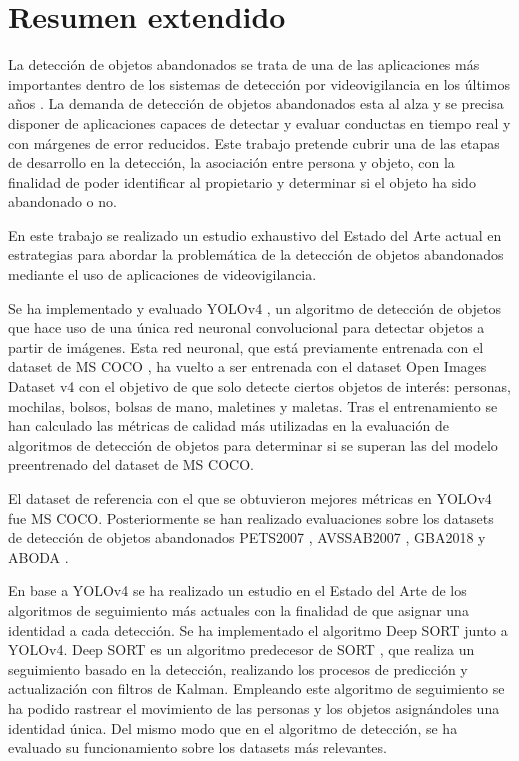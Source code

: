 
\chapter*{Resumen extendido}
\label{cha:resumen-extendido}


La detección de objetos abandonados se trata de una de las aplicaciones más importantes dentro de los sistemas de detección por videovigilancia en los últimos años \cite{DBLP:journals/spm/PlataniotisR05}. La demanda de detección de objetos abandonados esta al alza y se precisa disponer de aplicaciones capaces de detectar y evaluar conductas en tiempo real y con márgenes de error reducidos. Este trabajo pretende cubrir una de las etapas de desarrollo en la detección, la asociación entre persona y objeto, con la finalidad de poder identificar al propietario y determinar si el objeto ha sido abandonado o no.

En este trabajo se realizado un estudio exhaustivo del Estado del Arte actual en estrategias para abordar la problemática de la detección de objetos abandonados mediante el uso de aplicaciones de videovigilancia.

Se ha implementado y evaluado YOLOv4 \cite{bochkovskiy2020yolov4}, un algoritmo de detección de objetos que hace uso de una única red neuronal convolucional para detectar objetos a partir de imágenes. Esta red neuronal, que está previamente entrenada con el dataset de MS COCO \cite{lin2015microsoft}, ha vuelto a ser entrenada con el dataset Open Images Dataset v4 \cite{Kuznetsova_2020} con el objetivo de que solo detecte ciertos objetos de interés: personas, mochilas, bolsos, bolsas de mano, maletines y maletas. Tras el entrenamiento se han calculado las métricas de calidad más utilizadas en la evaluación de algoritmos de detección de objetos para determinar si se superan las del modelo preentrenado del dataset de MS COCO.

El dataset de referencia con el que se obtuvieron mejores métricas en YOLOv4 fue MS COCO. Posteriormente se han realizado evaluaciones sobre los datasets de detección de objetos abandonados PETS2007 \cite{pets2007-dataset}, AVSSAB2007 \cite{AVSSAB2007-dataset}, GBA2018 \cite{gba-dataset} y ABODA \cite{aboda-dataset}. 

En base a YOLOv4 se ha realizado un estudio en el Estado del Arte de los algoritmos de seguimiento más actuales con la finalidad de que asignar una identidad a cada detección. Se ha implementado el algoritmo Deep SORT \cite{Wojke2017simple} junto a YOLOv4. Deep SORT  es un algoritmo predecesor de SORT \cite{Bewley_2016}, que realiza un seguimiento basado en la detección, realizando los procesos de predicción y actualización con filtros de Kalman. Empleando este algoritmo de seguimiento se ha podido rastrear el movimiento de las personas y los objetos asignándoles una identidad única. Del mismo modo que en el algoritmo de detección, se ha evaluado su funcionamiento sobre los datasets más relevantes.

